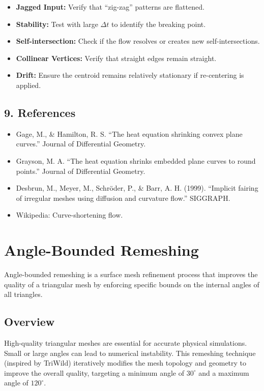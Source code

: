 \begin{itemize}
    \item \textbf{Jagged Input:} Verify that ``zig-zag'' patterns are flattened.
    \item \textbf{Stability:} Test with large $\Delta t$ to identify the breaking point.
    \item \textbf{Self-intersection:} Check if the flow resolves or creates new self-intersections.
    \item \textbf{Collinear Vertices:} Verify that straight edges remain straight.
    \item \textbf{Drift:} Ensure the centroid remains relatively stationary if re-centering is applied.
\end{itemize}

\subsection{9. References}

\begin{itemize}
    \item Gage, M., \& Hamilton, R. S. \cite{gage1986} ``The heat equation shrinking convex plane curves.'' Journal of Differential Geometry.
    \item Grayson, M. A. \cite{grayson1987} ``The heat equation shrinks embedded plane curves to round points.'' Journal of Differential Geometry.
    \item Desbrun, M., Meyer, M., Schr\"{o}der, P., \& Barr, A. H. (1999). ``Implicit fairing of irregular meshes using diffusion and curvature flow.'' SIGGRAPH.
    \item Wikipedia: Curve-shortening flow.
\end{itemize}

\section{Angle-Bounded Remeshing}
\label{sec:angle_bounded_remesher}

Angle-bounded remeshing is a surface mesh refinement process that improves the quality of a triangular mesh by enforcing specific bounds on the internal angles of all triangles.

\subsection{Overview}

High-quality triangular meshes are essential for accurate physical simulations\cite{botsch2010}. Small or large angles can lead to numerical instability. This remeshing technique (inspired by TriWild) iteratively modifies the mesh topology and geometry to improve the overall quality, targeting a minimum angle of $30^\circ$ and a maximum angle of $120^\circ$.


